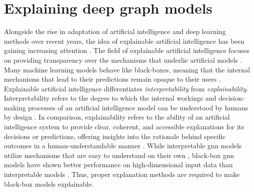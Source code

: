 \section{Explaining deep graph models}
\label{s_ExplainingGNNs}



Alongside the rise in adaptation of artificial intelligence and deep learning methods over recent years, the idea of explainable artificial intelligence has been gaining increasing attention \cite{adadi_peeking_2018}. The field of explainable artificial intelligence focuses on providing transparency over the mechanisms that underlie artificial models \cite{barredo_arrieta_explainable_2020}. Many machine learning models behave like black-boxes, meaning that the internal mechanisms that lead to their predictions remain opaque to their users \cite{prado-romero_survey_2023}. Explainable artificial intelligence differentiates \textit{interpretability} from \textit{explainability}.
Interpretability refers to the degree to which the internal workings and decision-making processes of an artificial intelligence model can be understood by humans by design \cite{barredo_arrieta_explainable_2020}.
In comparison, explainability refers to the ability of an artificial intelligence system to provide clear, coherent, and accessible explanations for its decisions or predictions, offering insights into the rationale behind specific outcomes in a human-understandable manner \cite{barredo_arrieta_explainable_2020}. While interpretable \gls{gnn} models utilize mechanisms that are easy to understand on their own \cite{prado-romero_survey_2023}, black-box \gls{gnn} models have shown better performance on high-dimensional input data than interpretable models \cite{prado-romero_survey_2023}. Thus, proper explanation methods are required to make black-box models explainable.


